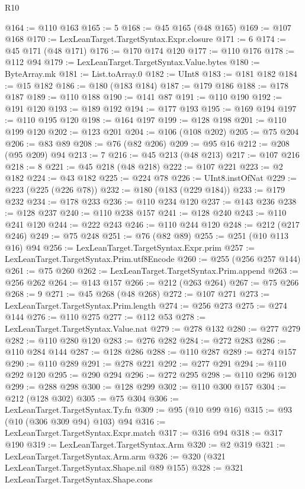 \begin{lexlean}{R10}
\begin{coremodule}
{{{{{{{{{{{{{{{{{{{{{{{{{{{{{{{{{{{{{{{{{{{{{{{{{{{{{{{{{{{{{{{{{{{{{{{{{{{{{{{{{{{{@164 := @110 @163
@165 := 5
@168 := @45 @165 (@48 @165)
@169 := @107 @168
@170 := LexLeanTarget.TargetSyntax.Expr.closure
@171 := 6
@174 := @45 @171 (@48 @171)
@176 := @170 @174 @120
@177 := @110 @176
@178 := @112 @94
@179 := LexLeanTarget.TargetSyntax.Value.bytes
@180 := ByteArray.mk
@181 := List.toArray.{0}
@182 := UInt8
@183 := @181 @182
@184 := @15 @182
@186 := @180 (@183 @184)
@187 := @179 @186
@188 := @178 @187
@189 := @110 @188
@190 := @141 @87
@191 := @110 @190
@192 := @191 @120
@193 := @189 @192
@194 := @177 @193
@195 := @169 @194
@197 := @110 @195 @120
@198 := @164 @197
@199 := @128 @198
@201 := @110 @199 @120
@202 := @123 @201
@204 := @106 (@108 @202)
@205 := @75 @204
@206 := @83 @89
@208 := @76 (@82 @206)
@209 := @95 @16
@212 := @208 (@95 @209) @94
@213 := 7
@216 := @45 @213 (@48 @213)
@217 := @107 @216
@218 := 8
@221 := @45 @218 (@48 @218)
@222 := @107 @221
@223 := @2 @182
@224 := @43 @182
@225 := @224 @78
@226 := UInt8.instOfNat
@229 := @223 (@225 (@226 @78))
@232 := @180 (@183 (@229 @184))
@233 := @179 @232
@234 := @178 @233
@236 := @110 @234 @120
@237 := @143 @236
@238 := @128 @237
@240 := @110 @238 @157
@241 := @128 @240
@243 := @110 @241 @120
@244 := @222 @243
@246 := @110 @244 @120
@248 := @212 (@217 @246)
@249 := @75 @248
@251 := @76 (@82 @89)
@255 := @251 (@10 @113 @16) @94
@256 := LexLeanTarget.TargetSyntax.Expr.prim
@257 := LexLeanTarget.TargetSyntax.Prim.utf8Encode
@260 := @255 (@256 @257 @144)
@261 := @75 @260
@262 := LexLeanTarget.TargetSyntax.Prim.append
@263 := @256 @262
@264 := @143 @157
@266 := @212 (@263 @264)
@267 := @75 @266
@268 := 9
@271 := @45 @268 (@48 @268)
@272 := @107 @271
@273 := LexLeanTarget.TargetSyntax.Prim.length
@274 := @256 @273
@275 := @274 @144
@276 := @110 @275
@277 := @112 @53
@278 := LexLeanTarget.TargetSyntax.Value.nat
@279 := @278 @132
@280 := @277 @279
@282 := @110 @280 @120
@283 := @276 @282
@284 := @272 @283
@286 := @110 @284 @144
@287 := @128 @286
@288 := @110 @287
@289 := @274 @157
@290 := @110 @289
@291 := @278 @221
@292 := @277 @291
@294 := @110 @292 @120
@295 := @290 @294
@296 := @272 @295
@298 := @110 @296 @120
@299 := @288 @298
@300 := @128 @299
@302 := @110 @300 @157
@304 := @212 (@128 @302)
@305 := @75 @304
@306 := LexLeanTarget.TargetSyntax.Ty.fn
@309 := @95 (@10 @99 @16)
@315 := @93 (@10 (@306 @309 @94) @103) @94
@316 := LexLeanTarget.TargetSyntax.Expr.match
@317 := @316 @94
@318 := @317 @190
@319 := LexLeanTarget.TargetSyntax.Arm
@320 := @2 @319
@321 := LexLeanTarget.TargetSyntax.Arm.arm
@326 := @320 (@321 LexLeanTarget.TargetSyntax.Shape.nil @89 @155)
@328 := @321 LexLeanTarget.TargetSyntax.Shape.cons
}}}}}}}}}}}}}}}}}}}}}}}}}}}}}}}}}}}}}}}}}}}}}}}}}}}}}}}}}}}}}}}}}}}}}}}}}}}}}}}}}}}}
\end{coremodule}
\end{lexlean}
